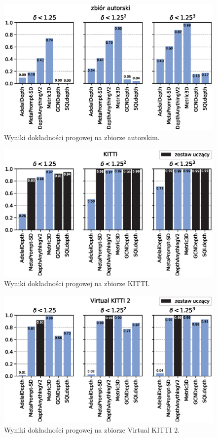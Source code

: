 \begin{figure}[H]
    \centering
    \includegraphics{plots/delta/3}
    \caption{Wyniki dokładności progowej na zbiorze autorskim.}
    \label{fig:delta_3}
\end{figure}
\begin{figure}[H]
    \centering
    \includegraphics{plots/delta/4}
    \caption{Wyniki dokładności progowej na zbiorze KITTI.}
    \label{fig:delta_4}
\end{figure}
\begin{figure}[H]
    \centering
    \includegraphics{plots/delta/5}
    \caption{Wyniki dokładności progowej na zbiorze Virtual KITTI 2.}
    \label{fig:delta_5}
\end{figure}

